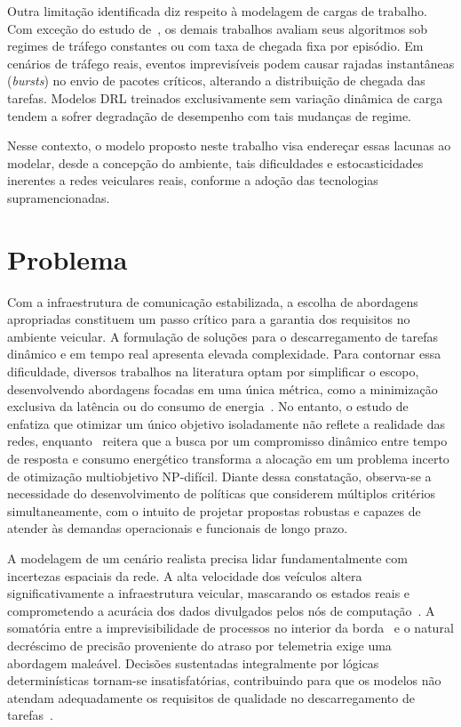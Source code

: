 Outra limitação identificada diz respeito à modelagem de cargas de trabalho. Com exceção do estudo de~\cite{Moghaddasi2023}, os demais trabalhos avaliam seus algoritmos sob regimes de tráfego constantes ou com taxa de chegada fixa por episódio. Em cenários de tráfego reais, eventos imprevisíveis podem causar rajadas instantâneas (\textit{bursts}) no envio de pacotes críticos, alterando a distribuição de chegada das tarefas. Modelos \gls{DRL} treinados exclusivamente sem variação dinâmica de carga tendem a sofrer degradação de desempenho com tais mudanças de regime.

Nesse contexto, o modelo proposto neste trabalho visa endereçar essas lacunas ao modelar, desde a concepção do ambiente, tais dificuldades e estocasticidades inerentes a redes veiculares reais, conforme a adoção das tecnologias supramencionadas.

\section{Problema}
\label{sec:problema}
Com a infraestrutura de comunicação estabilizada, a escolha de abordagens apropriadas constituem um passo crítico para a garantia dos requisitos no ambiente veicular. A formulação de soluções para o descarregamento de tarefas dinâmico e em tempo real apresenta elevada complexidade. Para contornar essa dificuldade, diversos trabalhos na literatura optam por simplificar o escopo, desenvolvendo abordagens focadas em uma única métrica, como a minimização exclusiva da latência ou do consumo de energia~\cite{feng2017ave, hou2016vehicular, ren2018latency, ren2019collaborative, zhang2019delay}. No entanto, o estudo de~\cite{qin2020} enfatiza que otimizar um único objetivo isoladamente não reflete a realidade das redes, enquanto~\cite{zhang2024} reitera que a busca por um compromisso dinâmico entre tempo de resposta e consumo energético transforma a alocação em um problema incerto de otimização multiobjetivo NP-difícil. Diante dessa constatação, observa-se a necessidade do desenvolvimento de políticas que considerem múltiplos critérios simultaneamente, com o intuito de projetar propostas robustas e capazes de atender às demandas operacionais e funcionais de longo prazo.

A modelagem de um cenário realista precisa lidar fundamentalmente com incertezas espaciais da rede. A alta velocidade dos veículos altera significativamente a infraestrutura veicular, mascarando os estados reais e comprometendo a acurácia dos dados divulgados pelos nós de computação~\cite{liu2025}. A somatória entre a imprevisibilidade de processos no interior da borda~\cite{abbas2025} e o natural decréscimo de precisão proveniente do atraso por telemetria exige uma abordagem maleável. Decisões sustentadas integralmente por lógicas determinísticas tornam-se insatisfatórias, contribuindo para que os modelos não atendam adequadamente os requisitos de qualidade no descarregamento de tarefas~\cite{kandali2025, zhao2025}.


